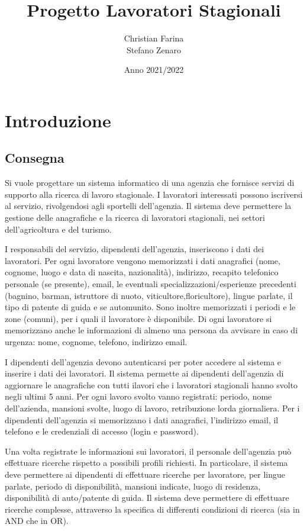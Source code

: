 \documentclass[ 4paper,11pt,openany]{book}
\title{Progetto Lavoratori Stagionali}
\author{Christian Farina\\Stefano Zenaro}
\date{Anno 2021/2022}
\begin{document}
\frontmatter
\maketitle
\tableofcontents 

\mainmatter
\chapter{Introduzione}
\section{Consegna}
Si vuole progettare un sistema informatico di una agenzia che fornisce servizi di supporto alla ricerca di lavoro stagionale. I lavoratori interessati possono iscriversi al servizio, rivolgendosi agli sportelli dell’agenzia. Il sistema deve permettere la gestione delle anagrafiche e la ricerca di lavoratori
stagionali, nei settori dell’agricoltura e del turismo. 

I responsabili del servizio, dipendenti dell’agenzia, inseriscono i dati dei lavoratori. 
Per ogni lavoratore vengono memorizzati i dati anagrafici (nome, cognome, luogo e data di nascita, nazionalità), indirizzo, recapito telefonico personale (se presente), email, le eventuali
specializzazioni/esperienze precedenti (bagnino, barman, istruttore di nuoto, viticultore,floricultore), lingue parlate, il tipo di patente di guida e se automunito. Sono inoltre memorizzati i periodi e le zone (comuni), per i quali il lavoratore è disponibile. Di ogni lavoratore si memorizzano anche le informazioni di almeno una persona da avvisare in caso di urgenza: nome, cognome, telefono, indirizzo email. 

I dipendenti dell’agenzia devono autenticarsi per poter accedere al sistema e inserire i dati dei lavoratori. Il sistema permette ai dipendenti dell’agenzia di aggiornare le anagrafiche con tutti ilavori che i lavoratori stagionali hanno svolto negli ultimi 5 anni. 
Per ogni lavoro svolto vanno registrati: periodo, nome dell’azienda, mansioni svolte, luogo di lavoro, retribuzione lorda giornaliera. Per i dipendenti dell’agenzia si memorizzano i dati anagrafici, l’indirizzo email, il telefono e le credenziali di accesso (login e password).

Una volta registrate le informazioni sui lavoratori, il personale dell’agenzia può effettuare ricerche rispetto a possibili profili richiesti.
In particolare, il sistema deve permettere ai dipendenti di effettuare ricerche per lavoratore, per lingue parlate, periodo di disponibilità, mansioni indicate, luogo di residenza, disponibilità di auto/patente di guida. Il sistema deve permettere di effettuare ricerche complesse, attraverso la specifica di differenti condizioni di ricerca (sia in AND che in OR).
\end{document}
